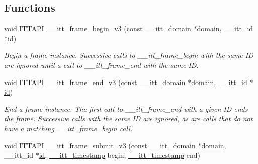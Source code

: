 \subsection*{Functions}
\begin{DoxyCompactItemize}
\item 
\hyperlink{ittnotify__static_8h_af941d56e55e3c5465135b60c4d6343ed}{void} I\-T\-T\-A\-P\-I \hyperlink{group__frames_ga093acc1a6ba76656835ddf17776d7ff3}{\-\_\-\-\_\-itt\-\_\-frame\-\_\-begin\-\_\-v3} (const \-\_\-\-\_\-itt\-\_\-domain $\ast$\hyperlink{ittnotify__static_8h_ae4bc3459cfd348603d57d87ede15591b}{domain}, \-\_\-\-\_\-itt\-\_\-id $\ast$\hyperlink{ittnotify__static_8h_a9ebeaf6e841ab2e3ed2f92a8850e0c3d}{id})
\begin{DoxyCompactList}\small\item\em Begin a frame instance. Successive calls to \-\_\-\-\_\-itt\-\_\-frame\-\_\-begin with the same I\-D are ignored until a call to \-\_\-\-\_\-itt\-\_\-frame\-\_\-end with the same I\-D. \end{DoxyCompactList}\item 
\hyperlink{ittnotify__static_8h_af941d56e55e3c5465135b60c4d6343ed}{void} I\-T\-T\-A\-P\-I \hyperlink{group__frames_ga04806851f8db36359587c111defde4e3}{\-\_\-\-\_\-itt\-\_\-frame\-\_\-end\-\_\-v3} (const \-\_\-\-\_\-itt\-\_\-domain $\ast$\hyperlink{ittnotify__static_8h_ae4bc3459cfd348603d57d87ede15591b}{domain}, \-\_\-\-\_\-itt\-\_\-id $\ast$\hyperlink{ittnotify__static_8h_a9ebeaf6e841ab2e3ed2f92a8850e0c3d}{id})
\begin{DoxyCompactList}\small\item\em End a frame instance. The first call to \-\_\-\-\_\-itt\-\_\-frame\-\_\-end with a given I\-D ends the frame. Successive calls with the same I\-D are ignored, as are calls that do not have a matching \-\_\-\-\_\-itt\-\_\-frame\-\_\-begin call. \end{DoxyCompactList}\item 
\hyperlink{ittnotify__static_8h_af941d56e55e3c5465135b60c4d6343ed}{void} I\-T\-T\-A\-P\-I \hyperlink{group__frames_ga18b8adc466f67480f699e5caa1889b81}{\-\_\-\-\_\-itt\-\_\-frame\-\_\-submit\-\_\-v3} (const \-\_\-\-\_\-itt\-\_\-domain $\ast$\hyperlink{ittnotify__static_8h_ae4bc3459cfd348603d57d87ede15591b}{domain}, \-\_\-\-\_\-itt\-\_\-id $\ast$\hyperlink{ittnotify__static_8h_a9ebeaf6e841ab2e3ed2f92a8850e0c3d}{id}, \hyperlink{ittnotify__static_8h_a4ebf58a692bfd3554b6b888095ea5b64}{\-\_\-\-\_\-itt\-\_\-timestamp} begin, \hyperlink{ittnotify__static_8h_a4ebf58a692bfd3554b6b888095ea5b64}{\-\_\-\-\_\-itt\-\_\-timestamp} end)

\end{DoxyCompactItemize}
